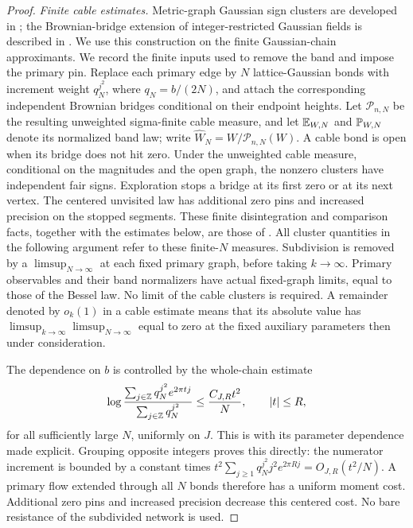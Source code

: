 \begin{proof}
\emph{Finite cable estimates.}
Metric-graph Gaussian sign clusters are developed in
\cite[Section~3, Lemma~3.2]{Lupu}; the Brownian-bridge extension of
integer-restricted Gaussian fields is described in
\cite[Section~7]{AHPS}. We use this construction on the finite
Gaussian-chain approximants.
We record the finite inputs used to remove the band and impose the
primary pin.  Replace each primary edge by \(N\) lattice-Gaussian
bonds with increment weight \(q_N^{j^2}\), where \(q_N=b/(2N)\),
and attach the corresponding independent Brownian bridges conditional
on their endpoint heights.  Let \(\mathcal P_{n,N}\) be the resulting
unweighted sigma-finite cable measure, and let \(\mathbb E_{W,N}\) and
\(\mathbb P_{W,N}\) denote its normalized band law; write
\(\widehat W_N=W/\mathcal P_{n,N}(W)\).  A cable bond is open
when its bridge does not hit zero.  Under the unweighted cable measure,
conditional on the magnitudes and the open graph, the nonzero clusters
have independent fair signs.  Exploration stops
a bridge at its first zero or at its next vertex.  The centered
unvisited law has additional zero pins and increased precision on
the stopped segments.  These finite disintegration and comparison
facts, together with the estimates below, are those of
\cite[Lemmas~2.2, 3.4, and~3.5]{X}.
All cluster quantities in the following argument refer to these
finite-\(N\) measures.  Subdivision is removed by a
\(\limsup_{N\to\infty}\) at each fixed primary graph, before taking
\(k\to\infty\).  Primary observables and their band normalizers
have actual fixed-graph limits, equal to those of the Bessel law.
No limit of the cable clusters is required.  A remainder denoted by
\(o_k(1)\) in a cable estimate means that its absolute value has
\(\limsup_{k\to\infty}\limsup_{N\to\infty}\) equal to zero at the
fixed auxiliary parameters then under consideration.

The dependence on \(b\) is controlled by the whole-chain estimate
\begin{equation}\label{eq:profile-chain-mgf}
 \log\frac{\sum_{j\in\mathbb Z}q_N^{j^2}e^{2\pi tj}}
               {\sum_{j\in\mathbb Z}q_N^{j^2}}
       \le \frac{C_{J,R}t^2}{N},\qquad |t|\le R,
\end{equation}
for all sufficiently large \(N\), uniformly on \(J\).
This is \cite[Equation~(3.5)]{X} with its parameter dependence made explicit.
Grouping opposite integers proves this directly: the numerator
increment is bounded by a constant times
\(t^2\sum_{j\ge1}q_N^{j^2}j^2e^{2\pi Rj}=O_{J,R}(t^2/N)\).
A primary flow extended through all \(N\) bonds therefore has a
uniform moment cost.  Additional zero pins and increased precision
decrease this centered cost.  No bare resistance of the subdivided
network is used.


\end{proof}
